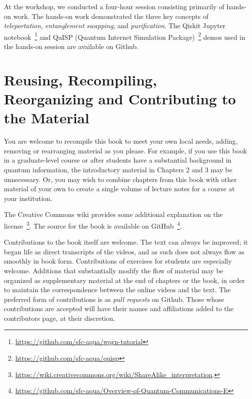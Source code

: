 At the workshop, we conducted a four-hour session consisting primarily of hands-on work.  The hands-on work demonstrated the three key concepts of \emph{teleportation}, \emph{entanglement swapping}, and \emph{purification}. The Qiskit Jupyter notebook~\footnote{\url{https://github.com/sfc-aqua/wqrn-tutorial}} and QuISP (Quantum Internet Simulation Package)~\footnote{\url{https://github.com/sfc-aqua/quisp}} demos used in the hands-on session are available on Github. 

\section*{Reusing, Recompiling, Reorganizing and Contributing to the Material}

You are welcome to recompile this book to meet your own local needs, adding, removing or rearranging material as you please. For example, if you use this book in a graduate-level course or after students have a substantial background in quantum information, the introductory material in Chapters 2 and 3 may be unnecessary. Or, you may wish to combine chapters from this book with other material of your own to create a single volume of lecture notes for a course at your institution.

The Creative Commons wiki provides some additional explanation on the license~\footnote{\url{https://wiki.creativecommons.org/wiki/ShareAlike_interpretation}.}.  The source for the book is available on GitHub~\footnote{\url{https://github.com/sfc-aqua/Overview-of-Quantum-Communications-E}}. 

Contributions to the book itself are welcome.  The text can always be improved; it began life as direct transcripts of the videos, and as such does not always flow as smoothly in book form.  Contributions of exercises for students are especially welcome.  Additions that substantially modify the flow of material may be organized as supplementary material at the end of chapters or the book, in order to maintain the correspondence between the online videos and the text.  The preferred form of contributions is as \emph{pull requests} on Github.  Those whose contributions are accepted will have their names and affiliations added to the contributors page, at their discretion.
